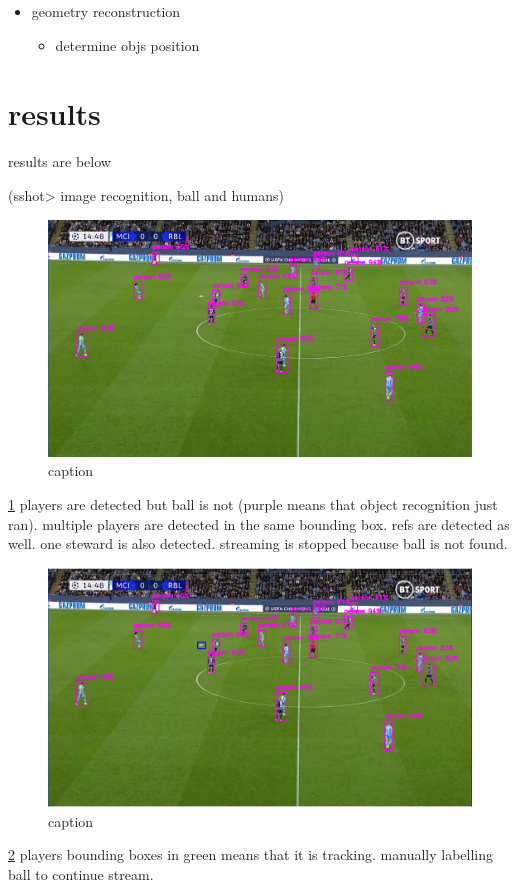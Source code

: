 \documentclass[
11pt,
twoside
]{report}
\begin{document}
\begin{itemize}
\item
    geometry reconstruction


    \begin{itemize}
        \item
        determine objs position
    \end{itemize}

\end{itemize}



\section{results}

results are below


\listoffigures

(sshot\textgreater{} image recognition, ball and humans)


\begin{figure}[H]
    \includegraphics[keepaspectratio, width=\columnwidth]{first.png}
    \caption{caption}
    \label{img:1}
\end{figure}
\ref{img:1}
players are detected but ball is not (purple means that object recognition just ran). multiple players are detected in the same bounding box. refs are detected as well. one steward is also detected. streaming is stopped because ball is not found.

\begin{figure}[H]
    \includegraphics[keepaspectratio, width=\columnwidth]{Screenshot_2022-03-03_21-32-51.png}
    \caption{caption}
    \label{img:2}
\end{figure}
\ref{img:2} players bounding boxes in green means that it is tracking. manually labelling ball to continue stream.
\end{document}
